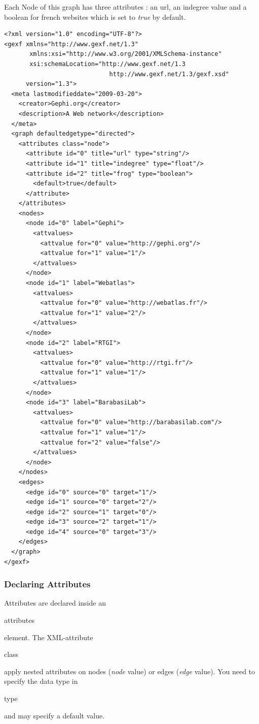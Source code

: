 \documentclass[a4paper,10pt]{article}
\begin{document}
Each Node of this graph has three attributes : an url, an indegree value and a boolean for french websites which is set to \textit{true} by default.

\lstset{ style=gexf }
\begin{lstlisting}[caption={A (small) Web Graph},label=webgraph]
<?xml version="1.0" encoding="UTF-8"?>
<gexf xmlns="http://www.gexf.net/1.3"
       xmlns:xsi="http://www.w3.org/2001/XMLSchema-instance"
       xsi:schemaLocation="http://www.gexf.net/1.3
                             http://www.gexf.net/1.3/gexf.xsd"
      version="1.3">
  <meta lastmodifieddate="2009-03-20">
    <creator>Gephi.org</creator>
    <description>A Web network</description>
  </meta>
  <graph defaultedgetype="directed">
    <attributes class="node">
      <attribute id="0" title="url" type="string"/>
      <attribute id="1" title="indegree" type="float"/>
      <attribute id="2" title="frog" type="boolean">
        <default>true</default>
      </attribute>
    </attributes>
    <nodes>
      <node id="0" label="Gephi">
        <attvalues>
          <attvalue for="0" value="http://gephi.org"/>
          <attvalue for="1" value="1"/>
        </attvalues>
      </node>
      <node id="1" label="Webatlas">
        <attvalues>
          <attvalue for="0" value="http://webatlas.fr"/>
          <attvalue for="1" value="2"/>
        </attvalues>
      </node>
      <node id="2" label="RTGI">
        <attvalues>
          <attvalue for="0" value="http://rtgi.fr"/>
          <attvalue for="1" value="1"/>
        </attvalues>
      </node>
      <node id="3" label="BarabasiLab">
        <attvalues>
          <attvalue for="0" value="http://barabasilab.com"/>
          <attvalue for="1" value="1"/>
          <attvalue for="2" value="false"/>
        </attvalues>
      </node>
    </nodes>
    <edges>
      <edge id="0" source="0" target="1"/>
      <edge id="1" source="0" target="2"/>
      <edge id="2" source="1" target="0"/>
      <edge id="3" source="2" target="1"/>
      <edge id="4" source="0" target="3"/>
    </edges>
  </graph>
</gexf>
\end{lstlisting}


\subsubsection{Declaring Attributes}

Attributes are declared inside an \begin{footnotesize}attributes\end{footnotesize} element. The XML-attribute \begin{footnotesize}class\end{footnotesize} apply nested attributes on nodes (\textit{node} value) or edges (\textit{edge} value). You need to specify the data type in \begin{footnotesize}type\end{footnotesize} and may specify a default value.
\end{document}
